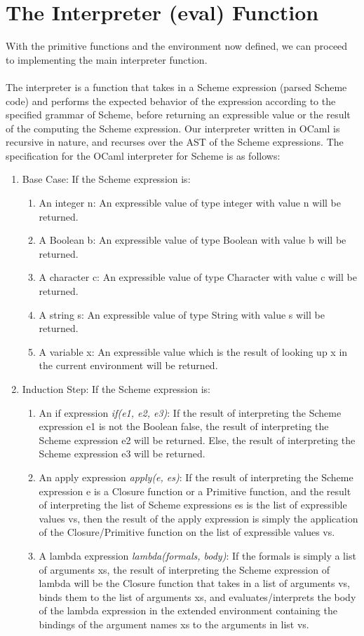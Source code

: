 \section{The Interpreter (eval) Function}
With the primitive functions and the environment now defined, we can proceed to implementing the main interpreter function.
\\
\\
The interpreter is a function that takes in a Scheme expression (parsed Scheme code) and performs the expected behavior of the expression according to the specified grammar of Scheme, before returning an expressible value or 
the result of the computing the Scheme expression. Our interpreter written in OCaml is recursive in nature, and recurses over the AST of the Scheme expressions. The specification for the OCaml interpreter for Scheme is as follows:
\begin{enumerate}
   \item Base Case: If the Scheme expression is: 
   \begin{enumerate}
      \item An integer n: An expressible value of type integer with value n will be returned.
	  \item A Boolean b: An expressible value of type Boolean with value b will be returned.
	  \item A character c: An expressible value of type Character with value c will be returned.
	  \item A string s: An expressible value of type String with value s will be returned.
	  \item A variable x: An expressible value which is the result of looking up x in the current environment will be returned.
   \end{enumerate}
   \item Induction Step: If the Scheme expression is:
   \begin{enumerate}
      \item An if expression \textit{if(e1, e2, e3)}: If the result of interpreting the Scheme expression e1 is not the Boolean false, the result of interpreting the Scheme expression e2 will be returned. 
	  Else, the result of interpreting the Scheme expression e3 will be returned.
	  \item An apply expression \textit{apply(e, es)}: If the result of interpreting the Scheme expression e is a Closure function or a Primitive function, and the result of interpreting the list of Scheme expressions es 
	  is the list of expressible values vs, then the result of the apply expression is simply the application of the Closure/Primitive function on the list of expressible values vs.
	  \item A lambda expression \textit{lambda(formals, body)}: If the formals is simply a list of arguments xs, the result of interpreting the Scheme expression of lambda will be the Closure function that takes in a list of 
	  arguments vs, binds them to the list of arguments xs, and evaluates/interprets the body of the lambda expression in the extended environment containing the bindings of the argument names xs to the arguments in list vs.
   \end{enumerate}
\end{enumerate}
